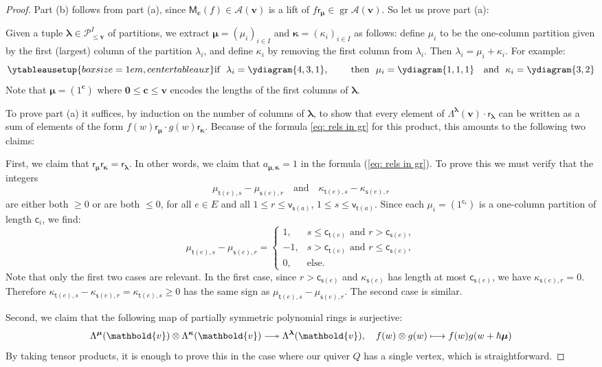 \documentclass[11pt,reqno]{amsart}
\renewcommand{\mathbf}{\mathbold}
\numberwithin{equation}{section}
\theoremstyle{definition}
\newcommand{\cA}{\mathcal{A}}
\newcommand{\cP}{\mathcal{P}}
\newcommand{\bc}{\mathbf{c}}
\newcommand{\bv}{\mathbf{v}}
\newcommand{\twoheadlongrightarrow}{\relbar\joinrel\twoheadrightarrow}
\DeclareMathOperator{\gr}{gr}
\renewcommand{\bv}{\mathbf{v}} %
\newcommand{\sv}{\mathsf{v}}
\renewcommand{\sc}{\mathsf{c}}
\newcommand{\M}{\mathsf{M}}
\newcommand{\sfr}{{\mathsf{r}}}
\newcommand{\source}{\mathsf{s}}
\newcommand{\target}{\mathsf{t}}
\newcommand{\vertexset}{I}
\newcommand{\arrowset}{E}
\newcommand{\GT}{\Lambda}
\newcommand{\Partitions}{\cP}
\newcommand{\bla}{{\boldsymbol{\lambda}}}
\newcommand{\bmu}{{\boldsymbol{\mu}}}
\newcommand{\qzast}{\cA}
\begin{document}
\begin{proof}
Part (b) follows from part (a), since $\M_\bc(f) \in \qzast(\bv)$ is a lift of $f \sfr_{\bmu} \in \gr \qzast(\bv)$.  So let us prove part (a):

Given a tuple $\bla \in \Partitions_{\leq \bv}^\vertexset$ of partitions, we extract $\bmu = (\mu_i)_{i \in  \vertexset}$ and $\boldsymbol{\kappa} = (\kappa_i)_{i \in  \vertexset}$ as follows: define $\mu_i$ to be the one-column partition given by the first (largest) column of the partition $\lambda_i$, and define $\kappa_i$ by removing the first column from $\lambda_i$. Then $\lambda_i = \mu_i + \kappa_i$. For example:
$$
\ytableausetup{boxsize=1em,centertableaux}
\text{if }\  \lambda_i = \ydiagram{4,3,1}, \qquad \text{ then }\ \mu_i = \ydiagram{1,1,1} \  \ \text{ and } \ \kappa_i = \ydiagram{3,2}
$$
Note that $\bmu = (1^{\bc})$ where $\mathbf{0} \leq \bc \leq \bv$ encodes the lengths of the first columns of $\bla$.  

To prove part (a) it suffices, by induction on the number of columns of $\bla$, to show that every element of $\GT^\bla(\bv)\cdot \sfr_\bla$ can be written as a sum of elements of the form $f(w) \sfr_\bmu \cdot g(w) \sfr_{\boldsymbol{\kappa}}$.  Because of the formula \eqref{eq: rels in gr} for this product, this amounts to the following two claims:

First, we claim that $\sfr_{\bmu} \sfr_{\boldsymbol{\kappa}}  = \sfr_{\bla}$. In other words, we claim that $a_{\bmu, \boldsymbol{\kappa}} = 1$ in the formula (\ref{eq: rels in gr}).  To prove this we must verify that the integers
$$
\mu_{\target(e),s} - \mu_{\source(e), r} \ \ \ \text{ and } \ \ \ \kappa_{\target(e), s} - \kappa_{\source(e), r}
$$
are either both $\geq 0$ or are both $\leq 0$, for all $e \in \arrowset$ and all $1 \leq r \leq \sv_{\source(a)}$, $1 \leq s \leq \sv_{\target(a)}$. Since each $\mu_i = (1^{\sc_i})$ is a one-column partition of length $\sc_i$, we find:
$$
\mu_{\target(e),s} - \mu_{\source(e), r} = \left\{ \begin{array}{rl} 1, & s \leq \sc_{\target(e)} \text{ and } r > \sc_{\source(e)}, \\ -1, & s > \sc_{\target(e)} \text{ and } r \leq \sc_{\source(e)}, \\ 0, & \text{else}. \end{array} \right.
$$
Note that only the first two cases are relevant.  In the first case, since $r > \sc_{\source(e)}$  and $\kappa_{\source(e)}$ has length at most $\sc_{\source(e)}$, we have $\kappa_{\source(e),r} = 0$. Therefore $\kappa_{\target(e), s} - \kappa_{\source(e), r} = \kappa_{\target(e), s} \geq 0$ has the same sign as $\mu_{\target(e),s} - \mu_{\source(e), r}$.  The second case is similar.

Second, we claim that the following map of partially symmetric polynomial rings is surjective:
\begin{equation}
\label{eq: psym polys}
\GT^{\bmu}(\bv) \otimes \GT^{\boldsymbol{\kappa}}(\bv)  \twoheadlongrightarrow \GT^{\bla}(\bv),  \ \ \  f(w) \otimes g(w) \longmapsto f(w) g(w+\hbar \bmu)
\end{equation}
By taking tensor products, it is enough to prove this in the case where our quiver $Q$ has a single vertex, which is straightforward.  
\end{proof}
\end{document}
